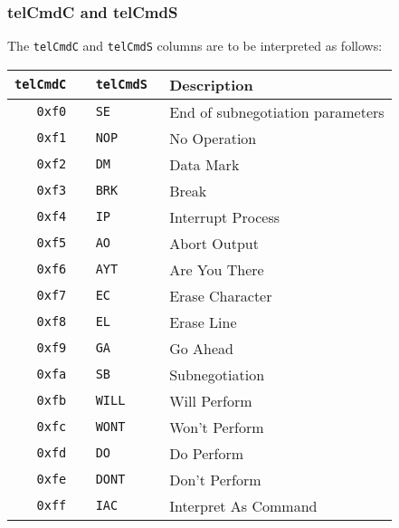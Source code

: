 \documentclass[documentation]{subfiles}
\begin{document}
\subsubsection{telCmdC and telCmdS}\label{telCmd}
The {\tt telCmdC} and {\tt telCmdS} columns are to be interpreted as follows:\\
\begin{longtable}{>{\tt}r>{\tt}ll}
    \toprule
    {\bf telCmdC} & {\bf telCmdS} & {\bf Description} \\
    \midrule\endhead%
    0xf0 & SE   & End of subnegotiation parameters\\
    0xf1 & NOP  & No Operation\\
    0xf2 & DM   & Data Mark\\
    0xf3 & BRK  & Break\\
    0xf4 & IP   & Interrupt Process\\
    0xf5 & AO   & Abort Output\\
    0xf6 & AYT  & Are You There\\
    0xf7 & EC   & Erase Character\\
    0xf8 & EL   & Erase Line\\
    0xf9 & GA   & Go Ahead\\
    0xfa & SB   & Subnegotiation\\
    0xfb & WILL & Will Perform\\
    0xfc & WONT & Won't Perform\\
    0xfd & DO   & Do Perform\\
    0xfe & DONT & Don't Perform\\
    0xff & IAC  & Interpret As Command\\
    \bottomrule
\end{longtable}
\end{document}
